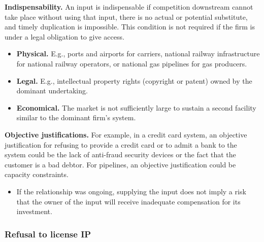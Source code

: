             \textbf{Indispensability.} An input is indispensable if competition downstream cannot take place without using that input, there is no actual or potential substitute, and timely duplication is impossible. This condition is not required if the firm is under a legal obligation to give access.

            \begin{itemize}
                \item \textbf{Physical.} E.g., ports and airports for carriers, national railway infrastructure for national railway operators, or national gas pipelines for gas producers.
                \item \textbf{Legal.} E.g., intellectual property rights (copyright or patent) owned by the dominant undertaking.
                \item \textbf{Economical.} The market is not sufficiently large to sustain a second facility similar to the dominant firm’s system.
            \end{itemize}
            
            \textbf{Objective justifications.} For example, in a credit card system, an objective justification for refusing to provide a credit card or to admit a bank to the system could be the lack of anti-fraud security devices or the fact that the customer is a bad debtor. For pipelines, an objective justification could be capacity constraints.
            
            \begin{itemize}
                \item If the relationship was ongoing, supplying the input does not imply a risk that the owner of the input will receive inadequate compensation for its investment.
            \end{itemize}

        \subsubsection{Refusal to license IP}


